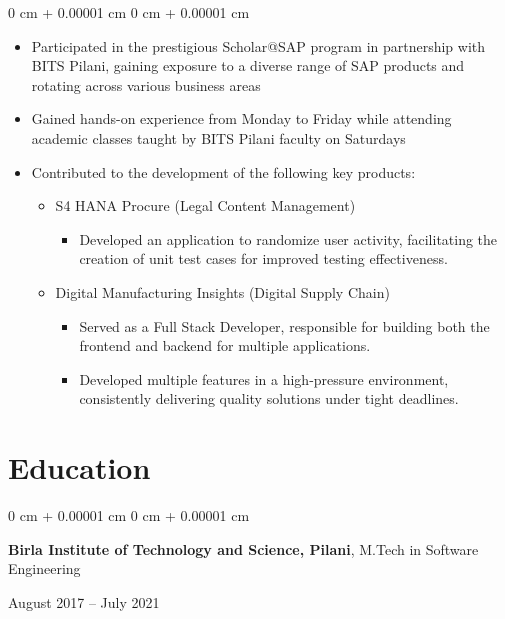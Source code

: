 \documentclass[10pt, letterpaper]{article}
\newenvironment{highlights}{
    \begin{itemize}[
        topsep=0.10 cm,
        parsep=0.10 cm,
        partopsep=0pt,
        itemsep=0pt,
        leftmargin=0 cm + 10pt
    ]
}{
    \end{itemize}
} %
\newenvironment{onecolentry}{
    \begin{adjustwidth}{
        0 cm + 0.00001 cm
    }{
        0 cm + 0.00001 cm
    }
}{
    \end{adjustwidth}
} %
\newenvironment{twocolentry}[2][]{
    \onecolentry
    \def\secondColumn{#2}
    \setcolumnwidth{\fill, 4.5 cm}
    \begin{paracol}{2}
}{
    \switchcolumn \raggedleft \secondColumn
    \end{paracol}
    \endonecolentry
} %
\begin{document}
        \vspace{0.10 cm}
        \begin{onecolentry}
            \begin{highlights}
                \item Participated in the prestigious Scholar@SAP program in partnership with BITS Pilani, gaining exposure to a diverse range of SAP products and rotating across various business areas
                \item Gained hands-on experience from Monday to Friday while attending academic classes taught by BITS Pilani faculty on Saturdays
                \item Contributed to the development of the following key products:
                \begin{itemize}
                    \item S4 HANA Procure (Legal Content Management)
                    \begin{itemize}
                        \item Developed an application to randomize user activity, facilitating the creation of unit test cases for improved
                        testing effectiveness.
                    \end{itemize}
                    \item Digital Manufacturing Insights (Digital Supply Chain)
                    \begin{itemize}
                        \item Served as a Full Stack Developer, responsible for building both the frontend and backend for multiple applications.
                        \item Developed multiple features in a high-pressure environment, consistently delivering quality solutions under tight deadlines.
                    \end{itemize}
                \end{itemize}

            \end{highlights}
        \end{onecolentry}

    \section{Education}

        \begin{twocolentry}{
            August 2017 – July 2021
        }
            \textbf{Birla Institute of Technology and Science, Pilani}, M.Tech in Software Engineering
        \end{twocolentry}
\end{document}
